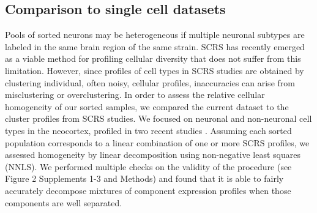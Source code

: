\subsection{Comparison to single cell datasets}
Pools of sorted neurons may be heterogeneous if multiple neuronal subtypes are labeled in the same brain region of the same strain. SCRS has recently emerged as a viable method for profiling cellular diversity that does not suffer from this limitation. However, since profiles of cell types in SCRS studies are obtained by clustering individual, often noisy, cellular profiles, inaccuracies can arise from misclustering or overclustering. In order to assess the relative cellular homogeneity of our sorted samples, we compared the current dataset to the cluster profiles from SCRS studies. We focused on neuronal and non-neuronal cell types in the neocortex, profiled in two recent studies \citep{Tasic_2016,Zeisel_2015}. Assuming  each sorted population corresponds to a linear combination of one or more SCRS profiles, we assessed homogeneity by linear decomposition using non-negative least squares (NNLS). We performed multiple checks on the validity of the procedure (see Figure 2 Supplements 1-3 and Methods) and found that it is able to fairly accurately decompose mixtures of component expression profiles when those components are well separated. 

